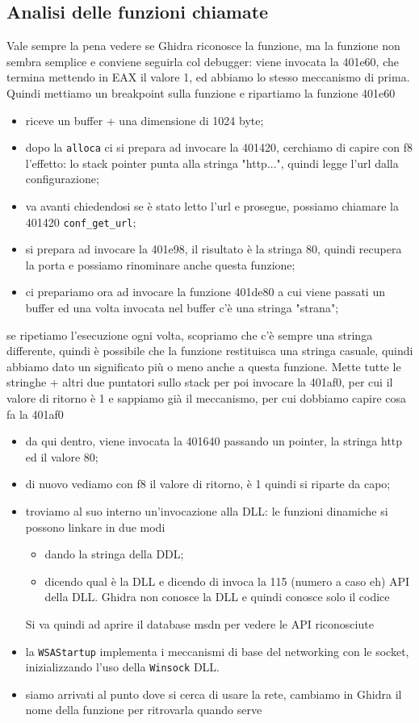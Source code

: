 \documentclass[12pt, oneside]{extbook}
\begin{document}
\subsection{Analisi delle funzioni chiamate}
Vale sempre la pena vedere se Ghidra riconosce la funzione, ma la funzione non sembra semplice e conviene seguirla col debugger: viene invocata la 401e60, che termina mettendo in EAX il valore 1, ed abbiamo lo stesso meccanismo di prima. Quindi mettiamo un breakpoint sulla funzione e ripartiamo
la funzione 401e60 
\begin{itemize}
\item riceve un buffer + una dimensione di 1024 byte;
\item dopo la \texttt{alloca} ci si prepara ad invocare la 401420, cerchiamo di capire con f8 l'effetto: lo stack pointer punta alla stringa "http...", quindi legge l'url dalla configurazione;
\item va avanti chiedendosi se è stato letto l'url e prosegue, possiamo chiamare la 401420 \texttt{conf\_get\_url};
\item si prepara ad invocare la 401e98, il risultato è la stringa 80, quindi recupera la porta e possiamo rinominare anche questa funzione;
\item ci prepariamo ora ad invocare la funzione 401de80 a cui viene passati un buffer ed una volta invocata nel buffer c'è una stringa "strana";
\end{itemize}
se ripetiamo l'esecuzione ogni volta, scopriamo che c'è sempre una stringa differente, quindi è possibile che la funzione restituisca una stringa casuale, quindi abbiamo dato un significato più o meno anche a questa funzione. Mette tutte le stringhe + altri due puntatori sullo stack per poi invocare la 401af0, per cui il valore di ritorno è 1 e sappiamo già il meccanismo, per cui dobbiamo capire cosa fa la 401af0
\begin{itemize}
\item da qui dentro, viene invocata la 401640 passando un pointer, la stringa http ed il valore 80;
\item di nuovo vediamo con f8 il valore di ritorno, è 1 quindi si riparte da capo;
\item troviamo al suo interno un'invocazione alla DLL: le funzioni dinamiche si possono linkare in due modi
\begin{itemize}
\item dando la stringa della DDL;
\item dicendo qual è la DLL e dicendo di invoca la 115 (numero a caso eh) API della DLL. Ghidra non conosce la DLL e quindi conosce solo il codice
\end{itemize}
Si va quindi ad aprire il database msdn per vedere le API riconosciute
\item la \texttt{WSAStartup} implementa i meccanismi di base del networking con le socket, inizializzando l'uso della \texttt{Winsock} DLL.
\item siamo arrivati al punto dove si cerca di usare la rete, cambiamo in Ghidra il nome della funzione per ritrovarla quando serve
\end{itemize}
\end{document}
